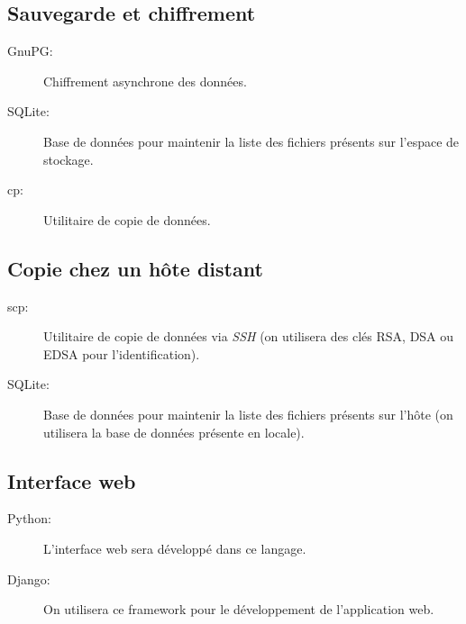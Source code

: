 \subsection{Sauvegarde et chiffrement}

\begin{description}
     \item[GnuPG:] Chiffrement asynchrone des données.
     \item[SQLite:] Base de données pour maintenir la liste des fichiers présents sur l'espace de stockage.
     \item[cp:] Utilitaire de copie de données.
\end{description}

\subsection{Copie chez un hôte distant}

\begin{description}
     \item[scp:] Utilitaire de copie de données via \textit{SSH} (on utilisera des clés RSA, DSA ou EDSA pour l'identification).
     \item[SQLite:] Base de données pour maintenir la liste des fichiers présents sur l'hôte (on utilisera la base de données présente en locale).
\end{description}

\subsection{Interface web}

\begin{description}
     \item[Python:] L'interface web sera développé dans ce langage.
     \item[Django:] On utilisera ce framework pour le développement de l'application web.
\end{description}
